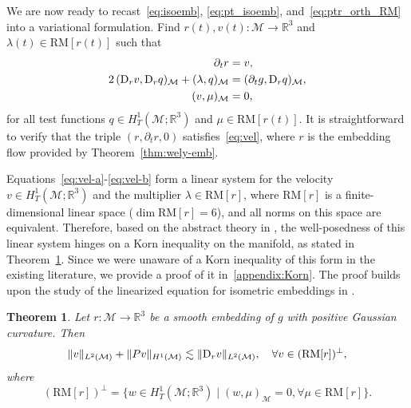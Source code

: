 \documentclass[11pt,a4paper,oneside,reqno]{amsart}
\theoremstyle{definition}
\theoremstyle{plain}
\newtheorem{theorem}{Theorem}
\numberwithin{theorem}{section}
\numberwithin{proposition}{section}
\numberwithin{lemma}{section}
\numberwithin{equation}{section}
\newcommand{\Man}{\mathcal{M}}
\newcommand{\RM}{\mathrm{RM}}
\begin{document}
We are now ready to recast~\eqref{eq:isoemb}, \eqref{eq:pt_isoemb}, and~\eqref{eq:ptr_orth_RM} into a variational formulation.
Find \(r(t),v(t):\Man\to\mathbb{R}^3\) and \( \lambda(t)\in \RM[r(t)] \) such that
\begin{subequations}\label{eq:vel}
\begin{align}
\label{eq:vel-r}
\partial_t r &= v, \\
\label{eq:vel-a}
2\,({\rm D}_r v, {\rm D}_r q)_{\Man} + (\lambda, q)_{\Man}
&= (\partial_t g, {\rm D}_r q)_{\Man}, \\
\label{eq:vel-b}
(v,\mu)_{\Man} &= 0,
\end{align}
\end{subequations}
for all test functions \(q\in H^1_T(\Man;\mathbb{R}^3)\) and \(\mu\in \RM[r(t)]\).
It is straightforward to verify that the triple \((r,\partial_t r,0)\) satisfies~\eqref{eq:vel}, where \(r\) is the embedding flow provided by Theorem~\ref{thm:wely-emb}.



Equations~\eqref{eq:vel-a}-\eqref{eq:vel-b} form a linear system for the velocity \(v \in H^1_T(\Man;\mathbb{R}^3)\) and the multiplier \(\lambda \in \RM[r]\), where \( \RM[r] \) is a finite-dimensional linear space (\(\dim \RM[r] = 6\)), and all norms on this space are equivalent. Therefore, based on the abstract theory in \cite{boffi2013mixed}, the well-posedness of this linear system hinges on a Korn inequality on the manifold, as stated in Theorem~\ref{lm:Korn}.
Since we were unaware of a Korn inequality of this form in the existing literature, we provide a proof of it in~\ref{appendix:Korn}. The proof builds upon the study of the linearized equation for isometric embeddings in \cite[Lemma 9.2.2]{han2006isometric}.
\begin{theorem}\label{lm:Korn} 
    Let \(r:\Man \rightarrow \mathbb{R}^3\) be a smooth embedding of \(g\) with positive Gaussian curvature. Then
\begin{equation}\label{eq:korn} 
\|v\|_{L^2(\Man)} + \| P v \|_{H^1(\Man)} \lesssim \| {\rm D}_r v \|_{L^2(\Man)},
\quad \forall v \in (\RM[r])^{\perp},
\end{equation} 
where 
\[
(\RM[r])^{\perp} 
= \{ w \in H^1_{T}(\Man; \mathbb{R}^3) \mid (w, \mu)_{\Man} = 0, \forall \mu \in \RM[r] \}.
\]
\end{theorem}
\end{document}
